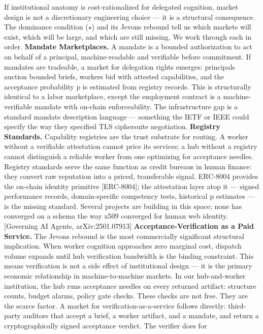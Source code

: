 \documentclass[
]{article}
\newcounter{none} %
\begin{document}
If institutional anatomy is cost-rationalized for delegated cognition,
market design is not a discretionary engineering choice --- it is a
structural consequence. The dominance condition ($\star$) and its Jevons
rebound tell us which markets will exist, which will be large, and which
are still missing. We work through each in order. \textbf{Mandate
Marketplaces.} A mandate is a bounded authorization to act on behalf of
a principal, machine-readable and verifiable before commitment. If
mandates are tradeable, a market for delegation rights emerges:
principals auction bounded briefs, workers bid with attested
capabilities, and the acceptance probability p is estimated from
registry records. This is structurally identical to a labor marketplace,
except the employment contract is a machine-verifiable mandate with
on-chain enforceability. The infrastructure gap is a standard mandate
description language --- something the IETF or IEEE could specify the
way they specified TLS ciphersuite negotiation. \textbf{Registry
Standards.} Capability registries are the trust substrate for routing. A
worker without a verifiable attestation cannot price its services; a hub
without a registry cannot distinguish a reliable worker from one
optimizing for acceptance needles. Registry standards serve the same
function as credit bureaus in human finance: they convert raw reputation
into a priced, transferable signal. ERC-8004 provides the on-chain
identity primitive {[}ERC-8004{]}; the attestation layer atop it ---
signed performance records, domain-specific competency tests, historical
p estimates --- is the missing standard. Several projects are building
in this space; none has converged on a schema the way x509 converged for
human web identity. {[}Governing AI Agents, arXiv:2501.07913{]}
\textbf{Acceptance-Verification as a Paid Service.} The Jevons rebound
is the most commercially significant structural implication. When worker
cognition approaches zero marginal cost, dispatch volume expands until
hub verification bandwidth is the binding constraint. This means
verification is not a side effect of institutional design --- it is the
primary economic relationship in machine-to-machine markets. In our
hub-and-worker institution, the hub runs acceptance needles on every
returned artifact: structure counts, budget alarms, policy gate checks.
These checks are not free. They are the scarce factor. A market for
verification-as-a-service follows directly: third-party auditors that
accept a brief, a worker artifact, and a mandate, and return a
cryptographically signed acceptance verdict. The verifier does for
\end{document}
